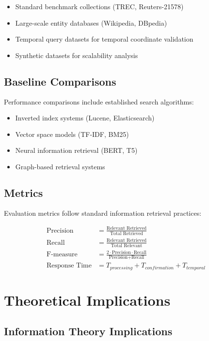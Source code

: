 \documentclass[12pt,a4paper]{article}
\begin{document}
\begin{itemize}
\item Standard benchmark collections (TREC, Reuters-21578)
\item Large-scale entity databases (Wikipedia, DBpedia)
\item Temporal query datasets for temporal coordinate validation
\item Synthetic datasets for scalability analysis
\end{itemize}

\subsection{Baseline Comparisons}

Performance comparisons include established search algorithms:

\begin{itemize}
\item Inverted index systems (Lucene, Elasticsearch)
\item Vector space models (TF-IDF, BM25)
\item Neural information retrieval (BERT, T5)
\item Graph-based retrieval systems
\end{itemize}

\subsection{Metrics}

Evaluation metrics follow standard information retrieval practices:

\begin{align}
\text{Precision} &= \frac{\text{Relevant Retrieved}}{\text{Total Retrieved}} \\
\text{Recall} &= \frac{\text{Relevant Retrieved}}{\text{Total Relevant}} \\
\text{F-measure} &= \frac{2 \cdot \text{Precision} \cdot \text{Recall}}{\text{Precision} + \text{Recall}} \\
\text{Response Time} &= T_{processing} + T_{confirmation} + T_{temporal}
\end{align}

\section{Theoretical Implications}

\subsection{Information Theory Implications}
\end{document}
